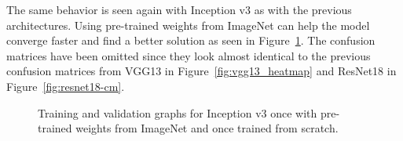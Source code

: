 \begin{table}[!h] \centering
{}
\caption{Hyper parameters for Inception v3 optimized with SigOpt. First row shows hyper parameters training the architecture from scratch. Second row used pre-trained weights from ImageNet.}
\label{tbl:Inceptionv3_overview}
\end{table}

The same behavior is seen again with Inception v3 as with the previous architectures. Using pre-trained weights from ImageNet can help the model converge faster and find a better solution as seen in Figure~\ref{fig:inception-graph}. The confusion matrices have been omitted since they look almost identical to the previous confusion matrices from VGG13 in Figure~\ref{fig:vgg13_heatmap} and ResNet18 in Figure~\ref{fig:resnet18-cm}. \\


\begin{figure}[!h]
\centering
\caption{Training and validation graphs for Inception v3 once with pre-trained weights from ImageNet and once trained from scratch.}
\label{fig:inception-graph}
\end{figure}

